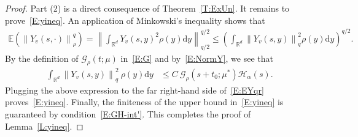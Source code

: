 \documentclass[a4paper,11pt]{article}%
\theoremstyle{plain}
\theoremstyle{definition}
\numberwithin{equation}{section}
\newcommand{\R}{\mathbb{R}}
\newcommand{\E}{\mathbb{E}}
\newcommand{\Norm}[1]{\left\| #1 \right\|}
\newcommand{\ud}{\ensuremath{\mathrm{d}}}
\begin{document}
\begin{proof}
  Part (2) is a direct consequence of Theorem~\ref{T:ExUn}. It remains to prove~\eqref{E:yineq}. An
  application of Minkowski's inequality shows that
  \begin{align}\label{E:EYqr}
    \E\left(\Norm{Y_v(s,\cdot)}_{\rho}^q\right)
    = \Norm{\int_{\R^d} Y_v(s,y)^2\rho(y) \ud y}_{q/2}^{q/2}
    \le \left(\int_{\R^d} \Norm{Y_v(s,y)}_q^2\rho(y) \ud y\right)^{q/2}.
  \end{align}
  By the definition of $\mathcal{G}_{\rho}(t;\mu)$ in~\eqref{E:G} and by~\eqref{E:NormY}, we see
  that
  \begin{align*}
    \int_{\R^d}\Norm{Y_v(s,y)}_q^2 \: \rho(y)\ud y
    & \le C \: \mathcal{G}_{\rho}(s + t_0;\mu^*) \mathcal{H}_\alpha(s).
  \end{align*}
  Plugging the above expression to the far right-hand side of~\eqref{E:EYqr} proves~\eqref{E:yineq}.
  Finally, the finiteness of the upper bound in~\eqref{E:yineq} is guaranteed by
  condition~\eqref{E:GH-int'}. This completes the proof of Lemma~\ref{L:yineq}.
\end{proof}
\end{document}
